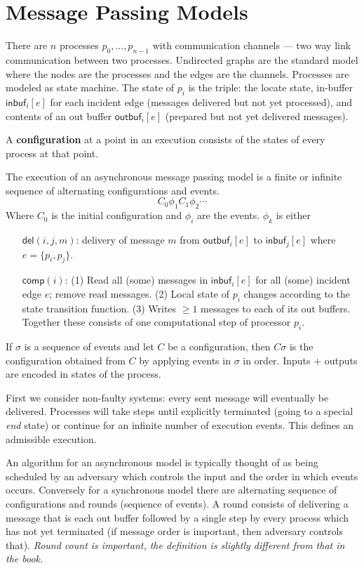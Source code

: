 \documentclass[twoside]{article}
\def\inbuf{\mathsf{inbuf}}
\def\outbuf{\mathsf{outbuf}}
\def\del{\mathsf{del}}
\def\comp{\mathsf{comp}}
\begin{document}
\section{Message Passing Models}
There are $n$ processes $p_0, ..., p_{n-1}$ with communication channels --- two way link communication between two processes. Undirected graphs are the standard model where the nodes are the processes and the edges are the channels. Processes are modeled as state machine. The state of $p_i$ is the triple: the locate state, in-buffer $\inbuf_i[e]$ for each incident edge (messages delivered but not yet processed), and contents of an out buffer $\outbuf_i[e]$ (prepared but not yet delivered messages). 

A \textbf{configuration} at a point in an execution consists of the states of every process at that point.

The execution of an asynchronous message passing model is a finite or infinite sequence of alternating configurations and events. 
\[C_0 \phi_1 C_1 \phi_2 \cdots\]
Where $C_0$ is the initial configuration and $\phi_i$ are the events. $\phi_k$ is either
\begin{enumerate}
\item[$\del(i,j,m)$:] delivery of message $m$ from $\outbuf_i[e]$ to $\inbuf_j[e]$ where $e = \{p_i, p_j\}$.
\item[$\comp(i)$:] (1) Read all (some) messages in $\inbuf_i[e]$ for all (some) incident edge $e$; remove read messages. (2) Local state of $p_i$ changes according to the state transition function. (3) Writes $\geq 1$ messages to each of its out buffers. Together these consists of one computational step of processor $p_i$. 
\end{enumerate}

If $\sigma$ is a sequence of events and let $C$ be a configuration, then $C\sigma$ is the configuration obtained from $C$ by applying events in $\sigma$ in order. Inputs + outputs are encoded in states of the process.

First we consider non-faulty systems: every sent message will eventually be delivered. Processes will take steps until explicitly terminated (going to a special \emph{end} state) or continue for an infinite number of execution events. This defines an admissible execution.

An algorithm for an asynchronous model is typically thought of as being scheduled by an adversary which controls the input and the order in which events occurs. Conversely for a synchronous model there are alternating sequence of configurations and rounds (sequence of events). A round consists of delivering a message that is each out buffer followed by a single step by every process which has not yet terminated (if message order is important, then adversary controls that). \emph{Round count is important, the definition is slightly different from that in the book.}
\end{document}
